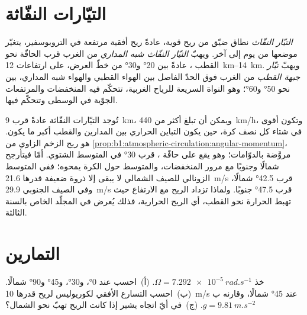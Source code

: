 \section{التيّارات النفّاثة}\label{sec:b1:atmospheric-circulation:jets}

\begin{definition}\label{def:b1:atmospheric-circulation:jet}
\emph{التيّار النفّاث} نطاق ضيّق من ريح قوية، عادةً ريح أفقية مرتفعة في التروبوسفير، يتغيّر موضعها من يوم إلى آخر. ويهبّ \emph{التيّار النفّاث شبه المداري} من الغرب قرب الحافّة نحو القطب ، عادةً بين \ang{20} و\ang{30} من خطّ العرض، على ارتفاعات \qtyrange{12}{14}{km}. ويهبّ \emph{تيّار جبهة القطب} من الغرب فوق الحدّ الفاصل بين الهواء القطبي والهواء شبه المداري، بين نحو \ang{50} و\ang{60}؛ وهو النواة السريعة للرياح الغربية، تتحكّم فيه المنخفضات والمرتفعات الجوّية في  الوسطى وتتحكّم فيها.
\end{definition}

تُوجد التيّارات النفّاثة عادةً قرب \qty{9}{km}، ويمكن أن تبلغ أكثر من \qty{440}{km/h}، وتكون أقوى في شتاء كل نصف كرة، حين يكون التباين الحراري بين المدارين والقطب أكبر ما يكون.  هو ريح الزخم الزاوي من \cref{prop:b1:atmospheric-circulation:angular-momentum}، مروَّضة بالدوّامات؛ وهو يقع على حافّة ، قرب \ang{30} في المتوسط الشتوي. أمّا  فيتأرجح شمالًا وجنوبًا مع مرور المنخفضات، والمتوسط حول الكرة يمحوه؛ ففي المتوسط الزونالي للصيف الشمالي لا يبقى إلا ذروة ضعيفة قدرها \qty{21.6}{m/s} قرب \ang{42.5} شمالًا، وفي الصيف الجنوبي \qty{29.9}{m/s} قرب \ang{47.5} جنوبًا. ولماذا تزداد الريح مع الارتفاع حيث تهبط الحرارة نحو القطب، أي الريح الحرارية، فذلك يُعرض في المجلّد الخاص بالسنة الثالثة.

\section{التمارين}

\begin{exercise}[$\star$]\label{exo:b1:atmospheric-circulation:1}
خذ $\Omega = \qty{7.292e-5}{rad.s^{-1}}$. (أ)~احسب  عند
\ang{0}، و\ang{30}، و\ang{45} و\ang{90} شمالًا. (ب)~احسب التسارع الأفقي لكوريوليس لريح قدرها \qty{10}{m/s} عند \ang{45} شمالًا، وقارنه ب$g =
\qty{9.81}{m.s^{-2}}$. (ج)~في أيّ اتجاه يشير إذا كانت الريح تهبّ نحو الشمال؟
\end{exercise}

